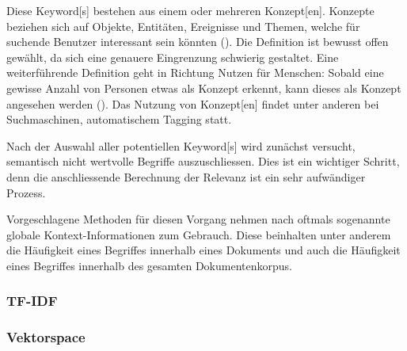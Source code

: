 Diese \gls{Keyword}[s] bestehen aus einem oder mehreren \gls{Konzept}[en]. Konzepte beziehen sich auf Objekte, Entitäten, Ereignisse und Themen, welche für suchende Benutzer interessant sein könnten (\cite{dalvi2009web}). Die Definition ist bewusst offen gewählt, da sich eine genauere Eingrenzung schwierig gestaltet. Eine weiterführende Definition geht in Richtung Nutzen für Menschen: Sobald eine gewisse Anzahl von Personen etwas als Konzept erkennt, kann dieses als Konzept angesehen werden (\cite{parameswaran2010towards}). Das Nutzung von \gls{Konzept}[en] findet unter anderen bei Suchmaschinen, automatischem Tagging statt.

Nach der Auswahl aller potentiellen \gls{Keyword}[s] wird zunächst versucht, semantisch nicht wertvolle Begriffe auszuschliessen. Dies ist ein wichtiger Schritt, denn die anschliessende Berechnung der Relevanz ist ein sehr aufwändiger Prozess. 




Vorgeschlagene Methoden für diesen Vorgang nehmen nach \cite[S.~85]{Zhang2006} oftmals sogenannte globale Kontext-Informationen zum Gebrauch. Diese beinhalten unter anderem die Häufigkeit eines Begriffes innerhalb eines Dokuments und auch die Häufigkeit eines Begriffes innerhalb des gesamten Dokumentenkorpus. %


\subsubsection{TF-IDF}




\subsubsection{Vektorspace}



